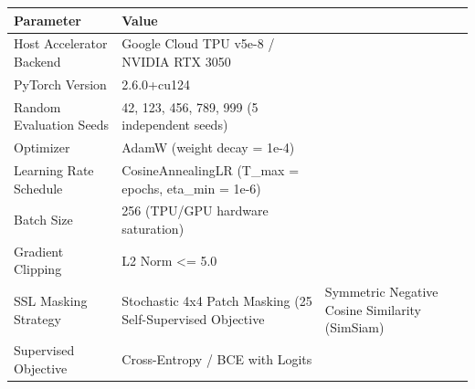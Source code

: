 \begin{tabular}{ll}
\toprule
Parameter & Value \\
\midrule
Host Accelerator Backend & Google Cloud TPU v5e-8 / NVIDIA RTX 3050 \\
PyTorch Version & 2.6.0+cu124 \\
Random Evaluation Seeds & 42, 123, 456, 789, 999 (5 independent seeds) \\
Optimizer & AdamW (weight decay = 1e-4) \\
Learning Rate Schedule & CosineAnnealingLR (T_max = epochs, eta_min = 1e-6) \\
Batch Size & 256 (TPU/GPU hardware saturation) \\
Gradient Clipping & L2 Norm <= 5.0 \\
SSL Masking Strategy & Stochastic 4x4 Patch Masking (25%
Self-Supervised Objective & Symmetric Negative Cosine Similarity (SimSiam) \\
Supervised Objective & Cross-Entropy / BCE with Logits \\
\bottomrule
\end{tabular}
